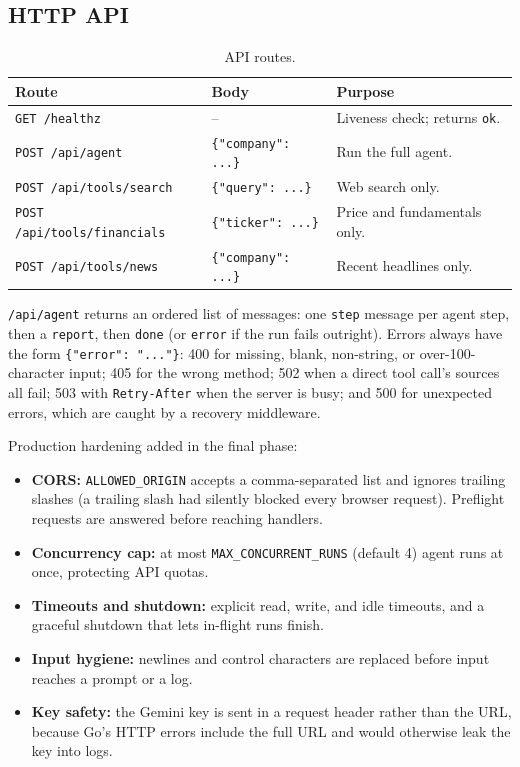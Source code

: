\documentclass[12pt,a4paper,oneside]{report}
\begin{document}
\subsection{HTTP API}
\begin{table}[H]\centering\small
\begin{tabularx}{\textwidth}{>{\raggedright\arraybackslash}p{4.4cm}>{\raggedright\arraybackslash}p{3.6cm}X}
\toprule \textbf{Route} & \textbf{Body} & \textbf{Purpose}\\\midrule
\texttt{GET /healthz} & -- & Liveness check; returns \texttt{ok}.\\
\texttt{POST /api/agent} & \texttt{\{"company": ...\}} & Run the full agent.\\
\texttt{POST /api/tools/search} & \texttt{\{"query": ...\}} & Web search only.\\
\texttt{POST /api/tools/financials} & \texttt{\{"ticker": ...\}} & Price and fundamentals only.\\
\texttt{POST /api/tools/news} & \texttt{\{"company": ...\}} & Recent headlines only.\\
\bottomrule
\end{tabularx}
\caption{API routes.}
\label{tab:api}
\end{table}
\texttt{/api/agent} returns an ordered list of messages: one \texttt{step} message per agent step, then a \texttt{report}, then \texttt{done} (or \texttt{error} if the run fails outright). Errors always have the form \texttt{\{"error": "..."\}}: 400 for missing, blank, non-string, or over-100-character input; 405 for the wrong method; 502 when a direct tool call's sources all fail; 503 with \texttt{Retry-After} when the server is busy; and 500 for unexpected errors, which are caught by a recovery middleware.

Production hardening added in the final phase:
\begin{itemize}[leftmargin=*]
\item \textbf{CORS:} \texttt{ALLOWED\_ORIGIN} accepts a comma-separated list and ignores trailing slashes (a trailing slash had silently blocked every browser request). Preflight requests are answered before reaching handlers.
\item \textbf{Concurrency cap:} at most \texttt{MAX\_CONCURRENT\_RUNS} (default 4) agent runs at once, protecting API quotas.
\item \textbf{Timeouts and shutdown:} explicit read, write, and idle timeouts, and a graceful shutdown that lets in-flight runs finish.
\item \textbf{Input hygiene:} newlines and control characters are replaced before input reaches a prompt or a log.
\item \textbf{Key safety:} the Gemini key is sent in a request header rather than the URL, because Go's HTTP errors include the full URL and would otherwise leak the key into logs.
\end{itemize}
\end{document}
